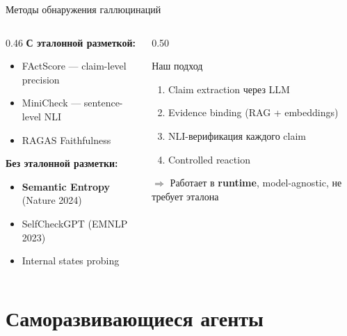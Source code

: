 \documentclass[aspectratio=169, 12pt]{beamer}
\begin{document}
\begin{frame}{Методы обнаружения галлюцинаций}
  \small
  \begin{columns}[T]
    \begin{column}{0.46\textwidth}
      \textbf{С эталонной разметкой:}
      \begin{itemize}\setlength\itemsep{2pt}
        \item FActScore --- claim-level precision
        \item MiniCheck --- sentence-level NLI
        \item RAGAS Faithfulness
      \end{itemize}
      \vspace{0.2cm}
      \textbf{Без эталонной разметки:}
      \begin{itemize}\setlength\itemsep{2pt}
        \item \textbf{Semantic Entropy} (Nature 2024)
        \item SelfCheckGPT (EMNLP 2023)
        \item Internal states probing
      \end{itemize}
    \end{column}
    \begin{column}{0.50\textwidth}
      \begin{block}{Наш подход}
        \begin{enumerate}\setlength\itemsep{2pt}
          \item Claim extraction через LLM
          \item Evidence binding (RAG + embeddings)
          \item NLI-верификация каждого claim
          \item Controlled reaction
        \end{enumerate}
      \end{block}
      \vspace{0.1cm}
      \textcolor{hseblue}{$\Rightarrow$} Работает в \textbf{runtime}, model-agnostic, не требует эталона
    \end{column}
  \end{columns}
\end{frame}

\section{Саморазвивающиеся агенты}
\end{document}
